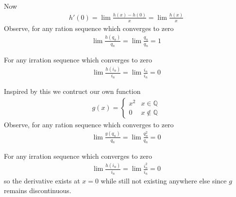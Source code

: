 Now 
\begin{align*}
    h'(0) = \lim \frac{h(x)-h(0)}{x} = \lim \frac{h(x)}{x}
\end{align*}
Observe, for any ration sequence which converges to zero 
\begin{align*}
    \lim \frac{h(q_n)}{q_n} = \lim \frac{q_n}{q_n} = 1
\end{align*}

For any irration sequence which converges to zero 
\begin{align*}
    \lim \frac{h(i_n)}{i_n} = \lim \frac{i_n}{i_n} = 0
\end{align*}

Inspired by this we contruct our own function 
\begin{align*}
    g(x) = \begin{cases}
        x^2 & x\in \mathbb{Q} \\
        0 & x\not\in \mathbb{Q}
    \end{cases}
\end{align*}
Observe, for any ration sequence which converges to zero 
\begin{align*}
    \lim \frac{g(q_n)}{q_n} = \lim \frac{q_n^2}{q_n} = 0
\end{align*}

For any irration sequence which converges to zero 
\begin{align*}
    \lim \frac{h(i_n)}{i_n} = \lim \frac{i_n^2}{i_n} = 0
\end{align*}
so the derivative exists at $x=0$ while still not existing 
anywhere else since $g$ remains discontinuous.


